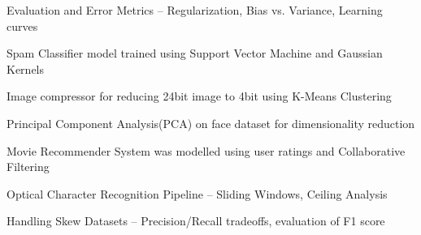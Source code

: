 \documentclass[]{deedy-resume-openfont}
\begin{document}
\begin{minipage}[t]{0.66\textwidth}
\begin{tightemize}
\item Evaluation and Error Metrics – Regularization, Bias vs. Variance, Learning curves
\item Spam Classifier model trained using Support Vector Machine and Gaussian Kernels
\item Image compressor for reducing 24bit image to 4bit using K-Means Clustering
\item Principal Component Analysis(PCA) on face dataset for dimensionality reduction
\item Movie Recommender System was modelled using user ratings and Collaborative Filtering
\item Optical Character Recognition Pipeline – Sliding Windows, Ceiling Analysis
\item Handling Skew Datasets – Precision/Recall tradeoffs, evaluation of F1 score
% 
\end{tightemize}

\sectionsep





\end{minipage}
\end{document}

